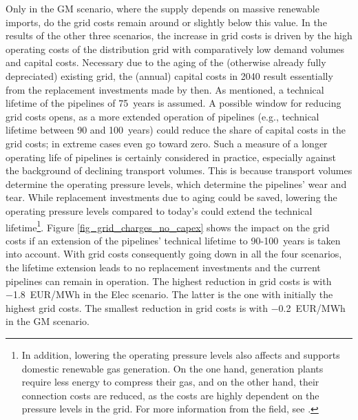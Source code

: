  Only in the GM scenario, where the supply depends on massive renewable imports, do the grid costs remain around or slightly below this value. In the results of the other three scenarios, the increase in grid costs is driven by the high operating costs of the distribution grid with comparatively low demand volumes and capital costs. Necessary due to the aging of the (otherwise already fully depreciated) existing grid, the (annual) capital costs in 2040 result essentially from the replacement investments made by then. As mentioned, a technical lifetime of the pipelines of \SI{75}{years} is assumed. A possible window for reducing grid costs opens, as a more extended operation of pipelines (e.g., technical lifetime between 90 and \SI{100}{years}) could reduce the share of capital costs in the grid costs; in extreme cases even go toward zero. Such a measure of a longer operating life of pipelines is certainly considered in practice, especially against the background of declining transport volumes. This is because transport volumes determine the operating pressure levels, which determine the pipelines' wear and tear. While replacement investments due to aging could be saved, lowering the operating pressure levels compared to today's could extend the technical lifetime\footnote{In addition, lowering the operating pressure levels also affects and supports domestic renewable gas generation. On the one hand, generation plants require less energy to compress their gas, and on the other hand, their connection costs are reduced, as the costs are highly dependent on the pressure levels in the grid. For more information from the field, see \cite{biogas_einspeisung}.}. Figure \ref{fig_grid_charges_no_capex} shows the impact on the grid costs if an extension of the pipelines' technical lifetime to \SI{90}{}-\SI{100}{years} is taken into account. With grid costs consequently going down in all the four scenarios, the lifetime extension leads to no replacement investments and the current pipelines can remain in operation. The highest reduction in grid costs is with \SI{-1.8}{EUR/MWh} in the Elec scenario. The latter is the one with initially the highest grid costs. The smallest reduction in grid costs is with \SI{-0.2}{EUR/MWh} in the GM scenario.

